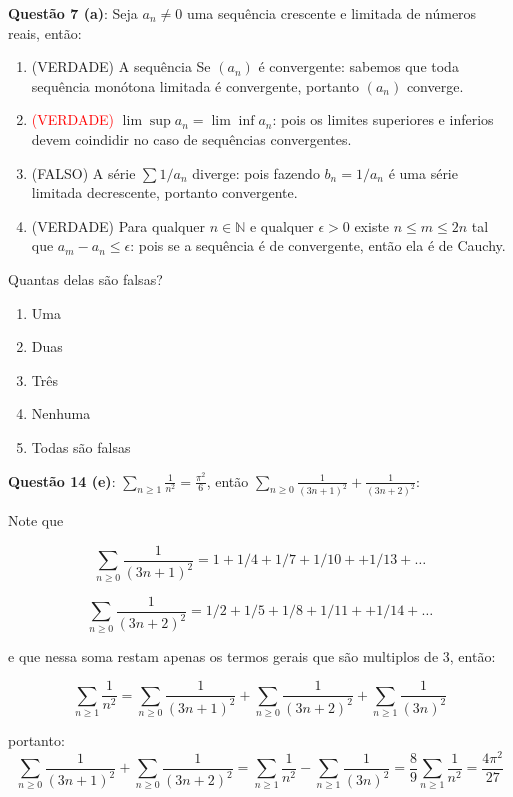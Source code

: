\documentclass{article}
\begin{document}
\textbf{Questão 7 (a)}: Seja $a_n \neq 0$ uma sequência crescente e limitada de
números reais, então:
\begin{enumerate}
  	\item (VERDADE) A sequência Se $(a_n)$ é convergente: sabemos que toda 
  	sequência monótona limitada é convergente, portanto $(a_n)$ converge.
  	
  	\item \textcolor{red}{(VERDADE)} $\lim \sup a_n = \lim \inf
  	a_n$: pois os limites superiores e inferios devem coindidir no caso de sequências convergentes.
  	
	\item (FALSO) A série $\sum 1/a_n$ diverge: pois fazendo $b_n = 1/a_n$ é uma
	série limitada decrescente, portanto convergente.
	
	\item (VERDADE) Para qualquer $n \in \mathbb{N}$ e qualquer $\epsilon >0 $
	existe $n \leq m \leq 2n$ tal que $a_m-a_n \leq \epsilon$: pois se a sequência
	é de convergente, então ela é de Cauchy.

\end{enumerate}

Quantas delas são falsas?

\begin{enumerate}[label=(\alph*)]
  \item Uma
  \item Duas
  \item Três
  \item Nenhuma
  \item Todas são falsas
\end{enumerate}

\textbf{Questão 14 (e)}: $\sum \limits_{n \geq 1} \frac{1}{n^2} =
\frac{\pi^2}{6}$, então $\sum \limits_{n \geq 0} \frac{1}{(3n+1)^2} +
\frac{1}{(3n+2)^2}$:

Note que 

$$\sum \limits_{n \geq 0} \frac{1}{(3n+1)^2} = 1 + 1/4 + 1/7 + 1/10 + + 1/13 +
\dots$$

$$\sum \limits_{n \geq 0} \frac{1}{(3n+2)^2} = 1/2 + 1/5 + 1/8 + 1/11 + + 1/14 +
\dots$$

e que nessa soma restam apenas os termos gerais que são multiplos de 3, então:

$$\sum \limits_{n \geq 1} \frac{1}{n^2} = \sum \limits_{n \geq 0}
\frac{1}{(3n+1)^2} + \sum \limits_{n \geq 0} \frac{1}{(3n+2)^2} + \sum \limits_{n \geq 1}
\frac{1}{(3n)^2} $$

portanto: 
$$\sum \limits_{n \geq 0}
\frac{1}{(3n+1)^2} + \sum \limits_{n \geq 0} \frac{1}{(3n+2)^2}  = \sum \limits_{n \geq 1} \frac{1}{n^2} - \sum \limits_{n \geq 1}
\frac{1}{(3n)^2} = \frac{8}{9}\sum \limits_{n \geq 1} \frac{1}{n^2} =
\frac{4\pi^2}{27}$$
\end{document}
